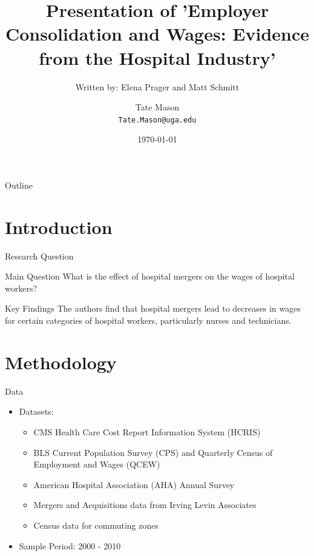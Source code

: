 \documentclass{beamer}
\title[]{Presentation of 'Employer Consolidation and Wages: Evidence from the Hospital Industry'}
\subtitle{Written by: Elena Prager and Matt Schmitt}
\author[Tate Mason]{Tate Mason\\ \smallskip \texttt{Tate.Mason@uga.edu}}
\date{\today} %
\begin{document}
\begin{frame}
  \titlepage
\end{frame}

\begin{frame}{Outline}
  \tableofcontents
\end{frame}

\section{Introduction}

\begin{frame}{Research Question}
  \begin{block}{Main Question}
    What is the effect of hospital mergers on the wages of hospital workers?
  \end{block}
  \pause
  \begin{exampleblock}{Key Findings}
    The authors find that hospital mergers lead to decreases in wages for certain categories of hospital workers, particularly nurses and technicians.
  \end{exampleblock}
\end{frame}

\section{Methodology}

\begin{frame}{Data}
  \begin{itemize}
    \item Datasets:
    \begin{itemize}
      \item CMS Health Care Cost Report Information System (HCRIS)
      \item BLS Current Population Survey (CPS) and Quarterly Census of Employment and Wages (QCEW)
      \item American Hospital Association (AHA) Annual Survey
      \item Mergers and Acquisitions data from Irving Levin Associates
      \item Census data for commuting zones
    \end{itemize}
    \item Sample Period: 2000 - 2010 
  \end{itemize}
\end{frame}
\end{document}
